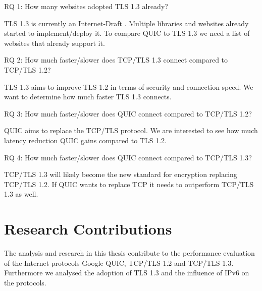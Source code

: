 \begin{QandA}

   \item [RQ 1:] How many websites adopted TLS 1.3 already?
         \begin{answered}
         TLS 1.3 is currently an Internet-Draft \cite{ietf-tls-tls13-28}. Multiple libraries and websites already started to implement/deploy it.
         To compare QUIC to TLS 1.3 we need a list of websites that already support it.
         \end{answered}
         
   \item [RQ 2:] How much faster/slower does TCP/TLS 1.3 connect compared to TCP/TLS 1.2?
   		\begin{answered}
         TLS 1.3 aims to improve TLS 1.2 in terms of security and connection speed.
         We want to determine how much faster TLS 1.3 connects.
         \end{answered}
         
   \item [RQ 3:] How much faster/slower does QUIC connect compared to TCP/TLS 1.2?
         \begin{answered}
         QUIC aims to replace the TCP/TLS protocol.
         We are interested to see how much latency reduction QUIC gains compared to TLS 1.2. 
         \end{answered}
        
   \item [RQ 4:] How much faster/slower does QUIC connect compared to TCP/TLS 1.3?
   		\begin{answered}
        TCP/TLS 1.3 will likely become the new standard for encryption replacing TCP/TLS 1.2.
        If QUIC wants to replace TCP it needs to outperform TCP/TLS 1.3 as well.
        \end{answered}
\end{QandA}

\newpage

\section{Research Contributions}

The analysis and research in this thesis contribute to the performance evaluation of the Internet protocols Google QUIC, TCP/TLS 1.2 and TCP/TLS 1.3. Furthermore we analysed the adoption of TLS 1.3 and the influence of IPv6 on the protocols.

